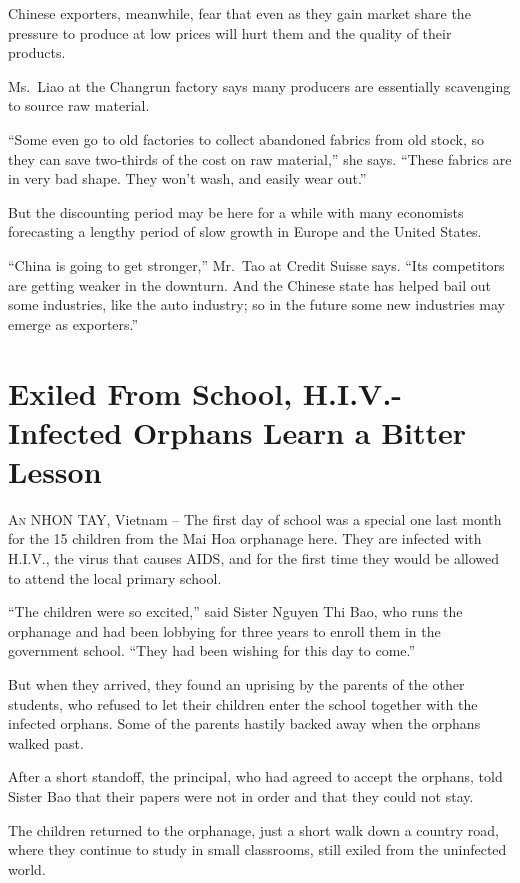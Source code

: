 ﻿\documentclass[12pt]{article}
\begin{document}
Chinese exporters, meanwhile, fear that even as they gain market share the pressure to produce at
low prices will hurt them and the quality of their products.

Ms.~Liao at the Changrun factory says many producers are essentially scavenging to source raw
material.

``Some even go to old factories to collect abandoned fabrics from old stock, so they can save
two-thirds of the cost on raw material,'' she says. ``These fabrics are in very bad shape. They
won't wash, and easily wear out.''

But the discounting period may be here for a while with many economists forecasting a lengthy period
of slow growth in Europe and the United States.

``China is going to get stronger,'' Mr.~Tao at Credit Suisse says. ``Its competitors are getting
weaker in the downturn. And the Chinese state has helped bail out some industries, like the auto
industry; so in the future some new industries may emerge as exporters.''

\section{Exiled From School, H.I.V.-Infected Orphans Learn a Bitter Lesson}

\lettrine{A}{n} NHON TAY, Vietnam -- The first day of school was a special
one last month for the 15 children from the Mai Hoa orphanage here. They are infected with H.I.V.,
the virus that causes AIDS, and for the first time they would be allowed to attend the local primary
school.

``The children were so excited,'' said Sister Nguyen Thi Bao, who runs the orphanage and had been
lobbying for three years to enroll them in the government school. ``They had been wishing for this
day to come.''

But when they arrived, they found an uprising by the parents of the other students, who refused to
let their children enter the school together with the infected orphans. Some of the parents hastily
backed away when the orphans walked past.

After a short standoff, the principal, who had agreed to accept the orphans, told Sister Bao that
their papers were not in order and that they could not stay.

The children returned to the orphanage, just a short walk down a country road, where they continue
to study in small classrooms, still exiled from the uninfected world.
\end{document}
